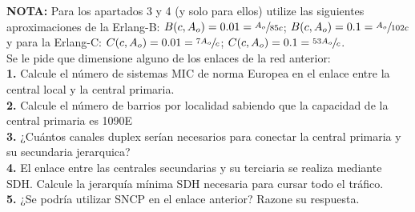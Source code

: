 \begin{exercise}[11]
\begin{itemize}
\end{itemize}
\textbf{NOTA:} Para los apartados 3 y 4 (y solo para ellos) utilize las siguientes aproximaciones de la Erlang-B: $B(c,A_o)=0.01=\sfrac{A_o}{85c}$; $B(c,A_o)=0.1=\sfrac{A_o}{102c}$ y para la Erlang-C: $C(c,A_o)=0.01=\sfrac{7A_o}{c}$; $C(c,A_o)=0.1=\sfrac{53A_o}{c}$.\\
Se le pide que dimensione alguno de los enlaces de la red anterior:\\
\textbf{1.} Calcule el número de sistemas MIC de norma Europea en el enlace entre la central local y la central primaria.\\
\textbf{2.} Calcule el número de barrios por localidad sabiendo que la capacidad de la central primaria es 1090E\\
\textbf{3.} ¿Cuántos canales duplex serían necesarios para conectar la central primaria y su secundaria jerarquica?\\
\textbf{4.} El enlace entre las centrales secundarias y su terciaria se realiza mediante SDH. Calcule la jerarquía mínima SDH  necesaria para cursar todo el tráfico.\\
\textbf{5.} ¿Se podría utilizar SNCP en el enlace anterior? Razone su respuesta.
\end{exercise}